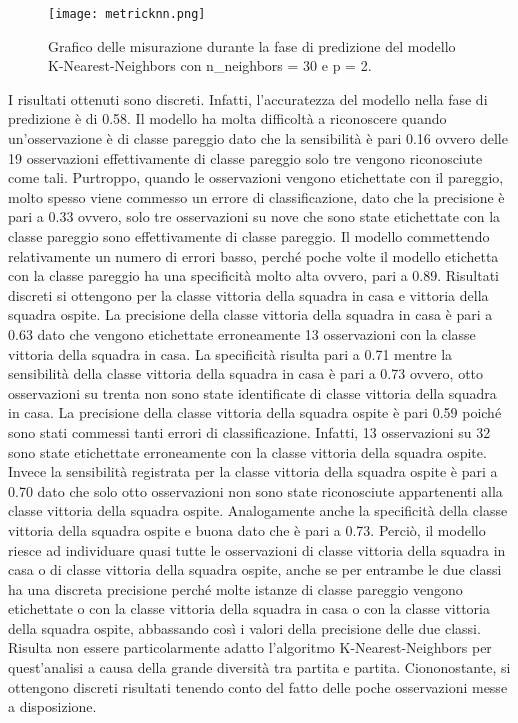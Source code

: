 \begin{figure}[h]
	\begin{center}
		\texttt{[image: metricknn.png]}
		\caption{Grafico delle misurazione durante la fase di predizione del modello K-Nearest-Neighbors con\textsf{ n\_neighbors} = 30 e \textsf{p} = 2.
		} 
		\label{fig:knnmetrics}
	\end{center}
\end{figure}
I risultati ottenuti sono discreti. Infatti, l'accuratezza del modello nella fase di predizione è di 0.58. Il modello ha molta difficoltà a riconoscere quando un’osservazione è di classe pareggio dato che la sensibilità è pari 0.16 ovvero delle 19 osservazioni effettivamente di classe pareggio solo tre vengono riconosciute come tali. Purtroppo, quando le osservazioni vengono etichettate con il pareggio, molto spesso viene commesso un errore di classificazione, dato che la precisione è pari a 0.33 ovvero, solo tre osservazioni su nove che sono state etichettate con la classe pareggio sono effettivamente di classe pareggio. Il modello commettendo relativamente un numero di errori basso, perché poche volte il modello etichetta con la classe pareggio ha una specificità molto alta ovvero, pari a 0.89. Risultati discreti si ottengono per la classe vittoria della squadra in casa e vittoria della squadra ospite. La precisione della classe vittoria della squadra in casa è pari a 0.63 dato che vengono etichettate erroneamente 13 osservazioni con la classe vittoria della squadra in casa. La specificità risulta pari a 0.71 mentre la sensibilità della classe vittoria della squadra in casa è pari a 0.73 ovvero, otto osservazioni su trenta non sono state identificate di classe vittoria della squadra in casa. La precisione della classe vittoria della squadra ospite è pari 0.59 poiché sono stati commessi tanti errori di classificazione. Infatti, 13 osservazioni su 32 sono state etichettate erroneamente con la classe vittoria della squadra ospite. Invece la sensibilità registrata per la classe vittoria della squadra ospite è pari a 0.70 dato che solo otto osservazioni non sono state riconosciute appartenenti alla classe vittoria della squadra ospite. Analogamente anche la specificità della classe vittoria della squadra ospite e buona dato che è pari a 0.73. Perciò, il modello riesce ad individuare quasi tutte le osservazioni di classe vittoria della squadra in casa o di classe vittoria della squadra ospite, anche se per entrambe le due classi ha una discreta precisione perché molte istanze di classe pareggio vengono etichettate o con la classe vittoria della squadra in casa o con la classe vittoria della squadra ospite, abbassando così i valori della precisione delle due classi.\\
Risulta non essere particolarmente adatto l'algoritmo K-Nearest-Neighbors per quest'analisi a causa della grande diversità tra partita e partita. Ciononostante, si ottengono discreti risultati tenendo conto del fatto delle poche osservazioni messe a disposizione.

